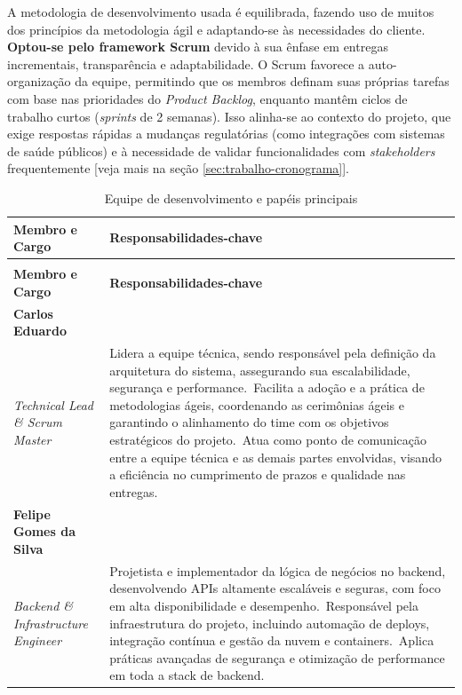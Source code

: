 \documentclass[a4paper, 12pt]{article}
\begin{document}
A metodologia de desenvolvimento usada é equilibrada, fazendo uso de muitos dos princípios da metodologia ágil e adaptando-se às necessidades do cliente. \textbf{Optou-se pelo framework Scrum} devido à sua ênfase em entregas incrementais, transparência e adaptabilidade. O Scrum favorece a auto-organização da equipe, permitindo que os membros definam suas próprias tarefas com base nas prioridades do \textit{Product Backlog}, enquanto mantêm ciclos de trabalho curtos (\textit{sprints} de 2 semanas). Isso alinha-se ao contexto do projeto, que exige respostas rápidas a mudanças regulatórias (como integrações com sistemas de saúde públicos) e à necessidade de validar funcionalidades com \textit{stakeholders} frequentemente [veja mais na seção \ref{sec:trabalho-cronograma}].

\newpage
\begin{longtable}[c]{@{} >{\raggedright\arraybackslash}p{4.5cm}>{\raggedright\arraybackslash}p{11cm} @{}}
  \caption{Equipe de desenvolvimento e papéis principais} \\
  \toprule
  \textbf{Membro e Cargo} & \textbf{Responsabilidades‑chave} \\
  \midrule
\endfirsthead

\multicolumn{2}{@{}l}{\textbf{Continuação da página anterior}} \\
  \toprule
  \textbf{Membro e Cargo} & \textbf{Responsabilidades‑chave} \\
  \midrule
\endhead

\bottomrule
\endfoot

\textbf{Carlos Eduardo} \\ \textit{Technical Lead \& Scrum Master} &
  Lidera a equipe técnica, sendo responsável pela definição da arquitetura do sistema, assegurando sua escalabilidade, segurança e performance.\
  Facilita a adoção e a prática de metodologias ágeis, coordenando as cerimônias ágeis e garantindo o alinhamento do time com os objetivos estratégicos do projeto.\
  Atua como ponto de comunicação entre a equipe técnica e as demais partes envolvidas, visando a eficiência no cumprimento de prazos e qualidade nas entregas. \\

\textbf{Felipe Gomes da Silva} \\ \textit{Backend \& Infrastructure Engineer} &
  Projetista e implementador da lógica de negócios no backend, desenvolvendo APIs altamente escaláveis e seguras, com foco em alta disponibilidade e desempenho.\
  Responsável pela infraestrutura do projeto, incluindo automação de deploys, integração contínua e gestão da nuvem e containers.\
  Aplica práticas avançadas de segurança e otimização de performance em toda a stack de backend. \\


\end{longtable}
\end{document}
